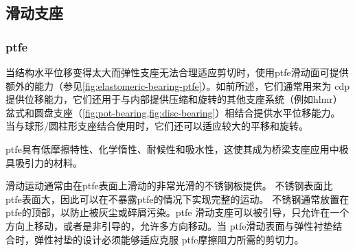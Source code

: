 \subsection{滑动支座}
\subsubsection{\acrfull*{ptfe}}
当结构水平位移变得太大而弹性支座无法合理适应剪切时，使用\acrfull{ptfe}滑动面可提供额外的能力（参见\cref{fig:elastomeric-bearing-ptfe}）。如前所述，它们通常用来为 \acrshort{cdp} 提供位移能力，它们还用于与内部提供压缩和旋转的其他支座系统（例如\acrfull{hlmr}）盆式和圆盘支座（\cref{fig:pot-bearing,fig:disc-bearing}）相结合提供水平位移能力。 当与球形/圆柱形支座结合使用时，它们还可以适应较大的平移和旋转。

\acrlong{ptfe}具有低摩擦特性、化学惰性、耐候性和吸水性，这使其成为桥梁支座应用中极具吸引力的材料。

滑动运动通常由在\acrlong*{ptfe}表面上滑动的非常光滑的不锈钢板提供。 不锈钢表面比 \acrlong*{ptfe}表面大，因此可以在不暴露\acrlong*{ptfe}的情况下实现完整的运动。 不锈钢通常放置在\acrlong*{ptfe}的顶部，以防止被灰尘或碎屑污染。\acrlong*{ptfe} 滑动支座可以被引导，只允许在一个方向上移动，或者是非引导的，允许多方向移动。当 \acrlong*{ptfe}滑动表面与弹性衬垫结合时，弹性衬垫的设计必须能够适应克服 \acrlong*{ptfe}摩擦阻力所需的剪切力。

